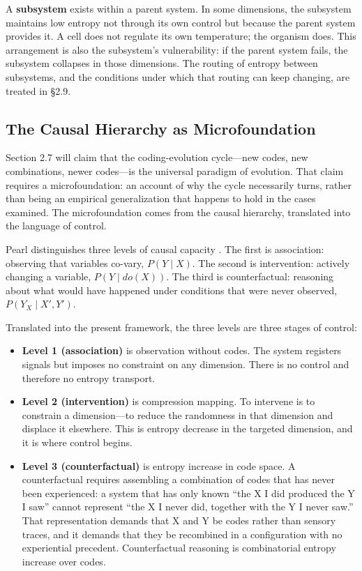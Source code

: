 \documentclass[11pt,a4paper]{article}
\begin{document}
A \textbf{subsystem} exists within a parent system. In some dimensions, the subsystem maintains low entropy not through its own control but because the parent system provides it. A cell does not regulate its own temperature; the organism does. This arrangement is also the subsystem's vulnerability: if the parent system fails, the subsystem collapses in those dimensions. The routing of entropy between subsystems, and the conditions under which that routing can keep changing, are treated in \S2.9.

\subsection{The Causal Hierarchy as Microfoundation}

Section 2.7 will claim that the coding-evolution cycle---new codes, new combinations, newer codes---is the universal paradigm of evolution. That claim requires a microfoundation: an account of why the cycle necessarily turns, rather than being an empirical generalization that happens to hold in the cases examined. The microfoundation comes from the causal hierarchy, translated into the language of control.

Pearl distinguishes three levels of causal capacity \citep{pearl2009, pearl2018}. The first is association: observing that variables co-vary, $P(Y \mid X)$. The second is intervention: actively changing a variable, $P(Y \mid do(X))$. The third is counterfactual: reasoning about what would have happened under conditions that were never observed, $P(Y_X \mid X', Y')$.

Translated into the present framework, the three levels are three stages of control:

\begin{itemize}
    \item \textbf{Level 1 (association)} is observation without codes. The system registers signals but imposes no constraint on any dimension. There is no control and therefore no entropy transport.
    \item \textbf{Level 2 (intervention)} is compression mapping. To intervene is to constrain a dimension---to reduce the randomness in that dimension and displace it elsewhere. This is entropy decrease in the targeted dimension, and it is where control begins.
    \item \textbf{Level 3 (counterfactual)} is entropy increase in code space. A counterfactual requires assembling a combination of codes that has never been experienced: a system that has only known ``the X I did produced the Y I saw'' cannot represent ``the X I never did, together with the Y I never saw.'' That representation demands that X and Y be codes rather than sensory traces, and it demands that they be recombined in a configuration with no experiential precedent. Counterfactual reasoning is combinatorial entropy increase over codes.
\end{itemize}
\end{document}
